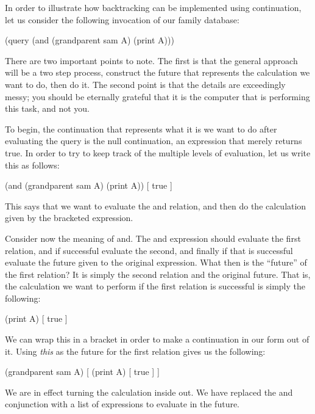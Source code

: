 In order to illustrate how backtracking can be implemented using
continuation, let us consider the following invocation of our family
database:

\begin{cprog}
(query (and (grandparent sam A) (print A)))
\end{cprog}

There are two important points to note.  The first is that the general
approach will be a two step process, construct the future that represents
the calculation we want to do, then do it.  The second point is that the
details are exceedingly messy; you should be eternally grateful that it is
the computer that is performing this task, and not you.

To begin, the continuation that represents what it is we want to do after
evaluating the query is the null continuation, an expression that merely
returns true.
In order to try to keep track of the multiple levels of evaluation, let us
write this as follows:

\begin{cprog}
(and (grandparent sam A) (print A)) [ true ]
\end{cprog}

This says that we want to evaluate the {\sf and} relation, and then do the
calculation given by the bracketed expression.

Consider now the meaning of {\sf and}.  The and expression should evaluate
the first relation, and if successful evaluate the second, and finally if
that is successful evaluate the future given to the original expression.
What then is the ``future'' of the first relation?  It is simply the second
relation and the original future.  That is, the calculation we want to
perform if the first relation is successful is simply the following:

\begin{cprog}
(print A) [ true ]
\end{cprog}

We can wrap this in a bracket in order to make a continuation in
our form out of it.  
Using {\em this} as the future for the first relation gives us the
following:

\begin{cprog}
(grandparent sam A) [ (print A) [ true ] ]
\end{cprog}

We are in effect turning the calculation inside out.  We have replaced the
{\sf and} conjunction with a list of expressions to evaluate in the future.

